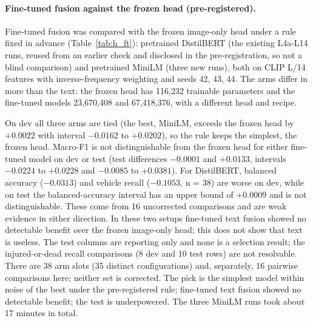 \paragraph{Fine-tuned fusion against the frozen head (pre-registered).}
Fine-tuned fusion was compared with the frozen image-only head under a rule fixed in advance (Table~\ref{tab:h_ft}): pretrained DistilBERT (the existing L4a-L14 runs, reused from an earlier check and disclosed in the pre-registration, so not a blind comparison) and pretrained MiniLM (three new runs), both on CLIP L/14 features with inverse-frequency weighting and seeds 42, 43, 44.
The arms differ in more than the text: the frozen head has 116,232 trainable parameters and the fine-tuned models 23,670,408 and 67,418,376, with a different head and recipe.
\begin{table}[t]
\centering
\small
\setlength{\tabcolsep}{3pt}
\caption{Fine-tuned fusion against the frozen image-only head (Task 2, CLIP L/14 features, inverse-frequency loss), seeds 42, 43, 44; mean $\pm$ seed std. The arms differ in more than the text (trainable parameters, head, recipe). The DistilBERT arm reuses earlier runs. Test columns are reporting only.}
\label{tab:h_ft}
\end{table}
On dev all three arms are tied (the best, MiniLM, exceeds the frozen head by $+0.0022$ with interval $-0.0162$ to $+0.0202$), so the rule keeps the simplest, the frozen head.
Macro-F1 is not distinguishable from the frozen head for either fine-tuned model on dev or test (test differences $-0.0001$ and $+0.0133$, intervals $-0.0224$ to $+0.0228$ and $-0.0085$ to $+0.0381$).
For DistilBERT, balanced accuracy ($-0.0313$) and vehicle recall ($-0.1053$, n = 38) are worse on dev, while on test the balanced-accuracy interval has an upper bound of $+0.0009$ and is not distinguishable.
These come from 16 uncorrected comparisons and are weak evidence in either direction.
In these two setups fine-tuned text fusion showed no detectable benefit over the frozen image-only head; this does not show that text is useless.
The test columns are reporting only and none is a selection result; the injured-or-dead recall comparisons (8 dev and 10 test rows) are not resolvable.
There are 38 arm slots (35 distinct configurations) and, separately, 16 pairwise comparisons here; neither set is corrected.
The pick is the simplest model within noise of the best under the pre-registered rule; fine-tuned text fusion showed no detectable benefit; the test is underpowered.
The three MiniLM runs took about 17 minutes in total.
